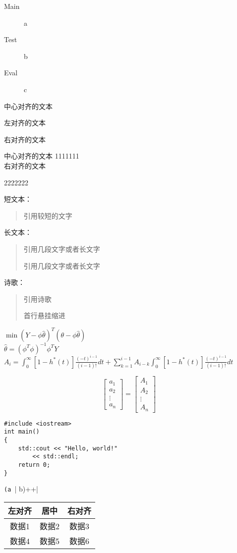\documentclass{ctexart}
\begin{document}
\begin{description}
\item[Main] a
\item[Test] b
\item[Eval] c  
\end{description}

\begin{center}
    中心对齐的文本
\end{center}

\begin{flushleft}
    左对齐的文本
\end{flushleft}

\begin{flushright}
    右对齐的文本
\end{flushright}

\centering 中心对齐的文本
1111111 \\
\raggedleft
右对齐的文本 \\
\raggedright
2222222 \par
短文本：
\begin{quote}
    引用较短的文字
\end{quote}
长文本：
\begin{quotation}
引用几段文字或者长文字

引用几段文字或者长文字
\end{quotation}
诗歌：
\begin{verse}
    引用诗歌

    首行悬挂缩进

\end{verse}

\begin{center}
    $ \min(Y-\phi\widehat{\theta})^{T}(\theta-\phi\widehat{\theta}) $\\
    $ \widehat{\theta}=(\phi^{T}\phi)^{-1}\phi^{T}Y   $\\
    $ A_i=\int_0^\infty [1-h^{*}(t)]\frac{(-t)^{i-1}}{(i-1)!}dt+\sum_{k=1}^{i-1} A_{i-k} \int_0^\infty [1-h^{*}(t)]\frac{(-t)^{i-1}}{(i-1)!} dt$

\end{center}

\begin{equation*}
\begin{bmatrix}a_1 \\ a_2 \\\vdots \\ a_n\end{bmatrix}=\begin{bmatrix}A_1 \\ A_2 \\\vdots \\ A_n\end{bmatrix}
\end{equation*}

\begin{verbatim}
#include <iostream>
int main()
{
    std::cout << "Hello, world!"
        << std::endl;
    return 0;
}
\end{verbatim}
\verb|(a || b)++|

\begin{tabular}{|c|c|c|}
  \hline
  左对齐 & 居中 & 右对齐 \\
  \hline
  数据1 & 数据2 & 数据3 \\
  数据4 & 数据5 & 数据6 \\
  \hline
\end{tabular}
\end{document}
